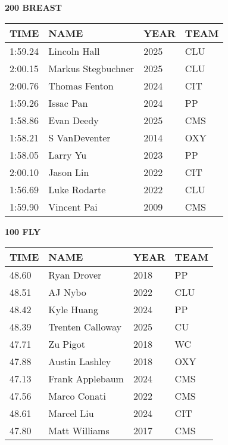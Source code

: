 \begin{minipage}[t]{0.48\textwidth}
\centering
\textbf{200 BREAST}\\[0.05cm]
\begin{tabular}{@{}p{1.8cm}p{2.8cm}p{1.2cm}p{1.4cm}@{}}
\hline
\textbf{TIME} & \textbf{NAME} & \textbf{YEAR} & \textbf{TEAM} \\
\hline
1:59.24 & Lincoln Hall & 2025 & CLU \\
2:00.15 & Markus Stegbuchner & 2025 & CLU \\
2:00.76 & Thomas Fenton & 2024 & CIT \\
1:59.26 & Issac Pan & 2024 & PP \\
1:58.86 & Evan Deedy & 2025 & CMS \\
1:58.21 & S VanDeventer & 2014 & OXY \\
1:58.05 & Larry Yu & 2023 & PP \\
2:00.10 & Jason Lin & 2022 & CIT \\
1:56.69 & Luke Rodarte & 2022 & CLU \\
1:59.90 & Vincent Pai & 2009 & CMS \\
\hline
\end{tabular}
\end{minipage}\hfill
\begin{minipage}[t]{0.48\textwidth}
\centering
\textbf{100 FLY}\\[0.05cm]
\begin{tabular}{@{}p{1.8cm}p{2.8cm}p{1.2cm}p{1.4cm}@{}}
\hline
\textbf{TIME} & \textbf{NAME} & \textbf{YEAR} & \textbf{TEAM} \\
\hline
48.60 & Ryan Drover & 2018 & PP \\
48.51 & AJ Nybo & 2022 & CLU \\
48.42 & Kyle Huang & 2024 & PP \\
48.39 & Trenten Calloway & 2025 & CU \\
47.71 & Zu Pigot & 2018 & WC \\
47.88 & Austin Lashley & 2018 & OXY \\
47.13 & Frank Applebaum & 2024 & CMS \\
47.56 & Marco Conati & 2022 & CMS \\
48.61 & Marcel Liu & 2024 & CIT \\
47.80 & Matt Williams & 2017 & CMS \\
\hline
\end{tabular}
\end{minipage}

\vspace{0.4cm}

